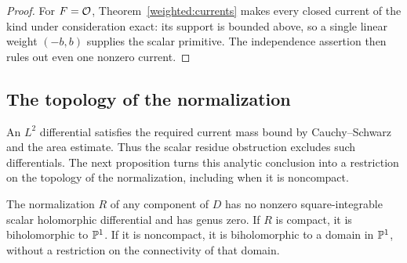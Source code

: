 \begin{proof}
For $F=\mathcal O$, Theorem~\ref{weighted:currents} makes every closed current
of the kind under consideration exact: its support is bounded above,
so a single linear weight $(-b,b)$ supplies the scalar primitive.
The independence assertion then rules out even one nonzero current.
\end{proof}

\subsection{The topology of the normalization}

An $L^2$ differential satisfies the required current mass bound by
Cauchy--Schwarz and the area estimate. Thus the scalar residue
obstruction excludes such differentials. The next proposition turns
this analytic conclusion into a restriction on the topology of the
normalization, including when it is noncompact.

\begin{proposition}\label{curve:genus}
The normalization $R$ of any component of $D$ has no nonzero
square-integrable scalar holomorphic differential and has genus zero.
If $R$ is compact, it is biholomorphic to $\mathbb P^1$.
If it is noncompact, it is biholomorphic to a domain in $\mathbb P^1$,
without a restriction on the connectivity of that domain.
\end{proposition}

